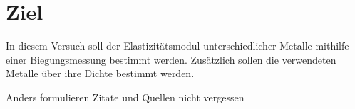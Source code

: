 \section{Ziel}

In diesem Versuch soll der Elastizitätsmodul unterschiedlicher Metalle mithilfe 
einer Biegungsmessung bestimmt werden. Zusätzlich sollen die verwendeten Metalle 
über ihre Dichte bestimmt werden.

Anders formulieren
Zitate und Quellen nicht vergessen
